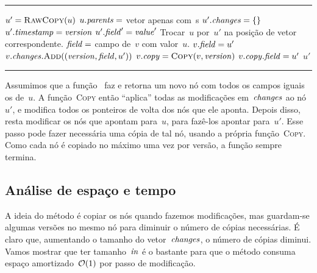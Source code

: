 \documentclass[../../main.tex]{subfiles}
\begin{document}
\vspace{1em}
\hrule
\begin{algorithmic}[1]

	\State $u' = \Call{RawCopy}{u}$
	\State $u.\mathit{parents} = $ vetor apenas com~s
	\State $u'.\mathit{changes} = \{\}$
	\State $u'.\mathit{timestamp} = \mathit{version}$
		\State $u'.\mathit{field}' = \mathit{value}'$
	\EndFor
		\State Trocar~$u$ por~$u'$ na posição de vetor correspondente.
	\EndIf
			\State {}
		\EndIf
	\EndFor
	 \label{line:copy:parents}
		\State $\mathit{field} = $ campo de~$v$ com valor~$u$.
		 
			\State $v.\mathit{field} = u'$
			\State $v.\V{changes}.\Call{Add}{(\V{version}, \V{field}, u')}$
		\Else
			\State $v.\V{copy} = \Call{Copy}{v, \V{version}}$ \label{line:copy:copy}
			\State $v.\mathit{copy}.\mathit{field} = u'$
		\EndIf
	\EndFor
	\State \Return $u'$
\EndFunction

\end{algorithmic}
\hrule
\vspace{1em}

Assumimos que a função~ faz e retorna um novo nó com todos os campos iguais os de~$u$.
A função~\textsc{Copy} então ``aplica'' todas as modificações em~$\mathit{changes}$ ao nó~$u'$, e modifica todos os ponteiros de volta dos nós que ele aponta. Depois disso, resta modificar os nós que apontam para~$u$, para fazê-los apontar para~$u'$. Esse passo pode fazer necessária uma cópia de tal nó, usando a própria função~\textsc{Copy}. Como cada nó é copiado no máximo uma vez por versão, a função sempre termina.

\subsection{Análise de espaço e tempo}

A ideia do método é copiar os nós quando fazemos modificações, mas guardam-se algumas versões no mesmo nó para diminuir o número de cópias necessárias. É claro que, aumentando o tamanho do vetor~$\mathit{changes}$, o número de cópias diminui. Vamos mostrar que ter tamanho~$\mathit{in}$ é o bastante para que o método consuma espaço amortizado~$\mathcal{O}(1)$ por passo de modificação.
\end{document}
